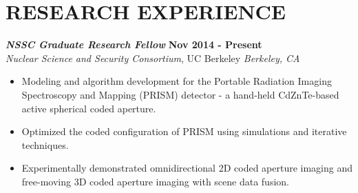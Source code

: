 \section{\small{RESEARCH EXPERIENCE}}

{\sl\bf NSSC Graduate Research Fellow} \hfill {\bf Nov 2014 - Present} \\
{\sl Nuclear Science and Security Consortium}, UC Berkeley \hfill {\sl Berkeley, CA} \\[-2.8ex]
\vspace{2pt}
\begin{itemize}[leftmargin=4ex] \itemsep -2pt
\item Modeling and algorithm development for the Portable Radiation Imaging Spectroscopy and Mapping (PRISM) detector - a hand-held CdZnTe-based active spherical coded aperture.
\item Optimized the coded configuration of PRISM using simulations and iterative techniques.
\item Experimentally demonstrated omnidirectional 2D coded aperture imaging and free-moving 3D coded aperture imaging with scene data fusion.
\end{itemize} 

